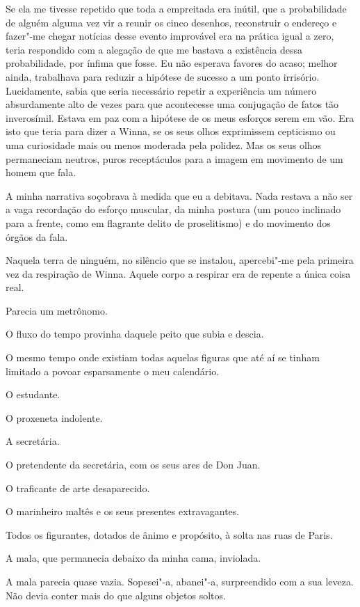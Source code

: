 Se ela me
tivesse repetido que toda a empreitada era inútil, que a probabilidade de alguém alguma vez vir a reunir os cinco
desenhos, reconstruir o endereço e fazer"-me chegar notícias desse evento
improvável era na prática igual a zero, teria respondido com a alegação
de que me bastava a existência dessa probabilidade, por ínfima que
fosse. Eu não esperava favores do acaso; melhor ainda, trabalhava para
reduzir a hipótese de sucesso a um ponto irrisório. Lucidamente, sabia
que seria necessário repetir a experiência um número absurdamente alto
de vezes para que acontecesse uma conjugação de fatos tão inverosímil.
Estava em paz com a hipótese de os meus esforços serem em vão. Era isto
que teria para dizer a Winna, se os seus olhos exprimissem cepticismo ou
uma curiosidade mais ou menos moderada pela polidez. Mas os seus olhos
permaneciam neutros, puros receptáculos para a imagem em movimento de um
homem que fala.

A minha narrativa soçobrava à medida que eu a debitava. Nada restava a
não ser a vaga recordação do esforço muscular, da minha postura (um
pouco inclinado para a frente, como em flagrante delito de proselitismo)
e do movimento dos órgãos da fala.

Naquela terra de ninguém, no silêncio que se instalou, apercebi"-me pela
primeira vez da respiração de Winna. Aquele
corpo a respirar era de repente a única coisa real.

Parecia um metrônomo.

O fluxo do tempo provinha daquele peito que subia e descia.

O mesmo tempo onde existiam todas aquelas figuras que até aí se tinham
limitado a povoar esparsamente o meu calendário.

O estudante.

O proxeneta indolente.

A secretária.

O pretendente da secretária, com os seus ares de Don Juan.

O traficante
de arte desaparecido.

O marinheiro maltês e os seus presentes extravagantes.

Todos os figurantes, dotados de ânimo e propósito, à solta nas ruas de
Paris.

A mala, que permanecia debaixo da minha cama, inviolada.

A mala parecia
quase vazia. Sopesei"-a, abanei"-a, surpreendido com a sua leveza. Não
devia conter mais do que alguns
objetos soltos.

